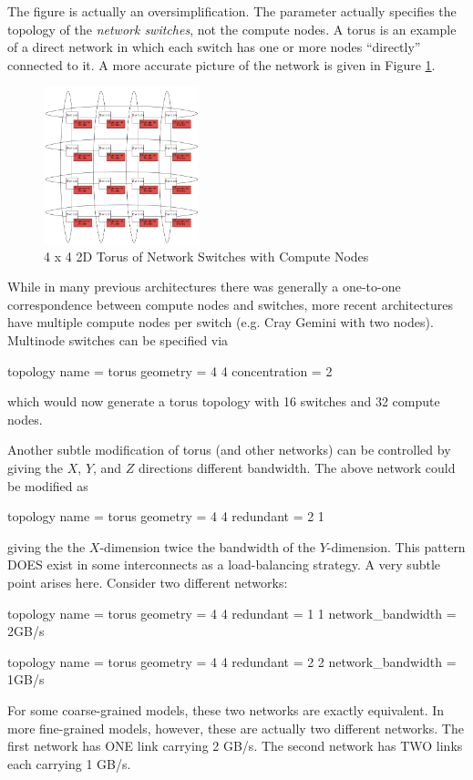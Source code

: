 The figure is actually an oversimplification.  
The  parameter actually specifies the topology of the \emph{network switches}, not the compute nodes. 
A torus is an example of a direct network in which each switch has one or more nodes ``directly'' connected to it.  
A more accurate picture of the network is given in Figure \ref{fig:torus:withnodes}.
\begin{figure}[h]
\centering
\includegraphics[width=0.4\textwidth]{figures/tikz/torus/withnodes.png}
\caption{4 x 4 2D Torus of Network Switches with Compute Nodes}
\label{fig:torus:withnodes}
\end{figure}
While in many previous architectures there was generally a one-to-one correspondence between compute nodes and switches, more recent architectures have multiple compute nodes per switch (e.g. Cray Gemini with two nodes).  
Multinode switches can be specified via

\begin{ViFile}
topology {
 name = torus
 geometry = 4 4
 concentration = 2
}
\end{ViFile}
which would now generate a torus topology with 16 switches and 32 compute nodes.

Another subtle modification of torus (and other networks) can be controlled by giving the $X$, $Y$, and $Z$ directions different bandwidth.  
The above network could be modified as

\begin{ViFile}
topology {
 name = torus
 geometry = 4 4
 redundant = 2 1
}
\end{ViFile}
giving the the $X$-dimension twice the bandwidth of the $Y$-dimension.  
This pattern DOES exist in some interconnects as a load-balancing strategy.  
A very subtle point arises here. Consider two different networks:

\begin{ViFile}
topology {
 name = torus
 geometry = 4 4
 redundant = 1 1
}
network_bandwidth = 2GB/s
\end{ViFile}
\begin{ViFile}
topology {
 name = torus
 geometry = 4 4
 redundant = 2 2
}
network_bandwidth = 1GB/s
\end{ViFile}
For some coarse-grained models, these two networks are exactly equivalent.  
In more fine-grained models, however, these are actually two different networks.  
The first network has ONE link carrying 2 GB/s. The second network has TWO links each carrying 1 GB/s.

